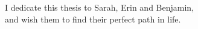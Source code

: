 
\thispagestyle{empty}
\vspace*{\fill}
\begin{flushright}
I dedicate this thesis to Sarah, Erin and Benjamin,\\
and wish them to find their perfect path in life.
\end{flushright}
\vspace*{\fill}
